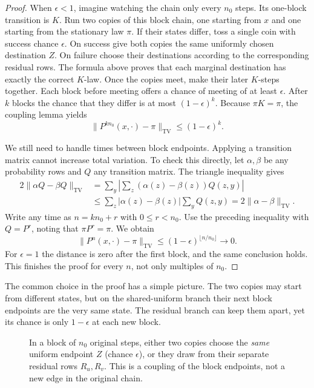 \begin{proof}
When $\epsilon<1$, imagine watching the chain only every $n_0$ steps. Its one-block transition is $K$. Run two copies of this block chain, one starting from $x$ and one starting from the stationary law $\pi$. If their states differ, toss a single coin with success chance $\epsilon$. On success give both copies the same uniformly chosen destination $Z$. On failure choose their destinations according to the corresponding residual rows. The formula above proves that each marginal destination has exactly the correct $K$-law. Once the copies meet, make their later $K$-steps together. Each block before meeting offers a chance of meeting of at least $\epsilon$. After $k$ blocks the chance that they differ is at most $(1-\epsilon)^k$. Because $\pi K=\pi$, the coupling lemma yields
\[
 \|P^{kn_0}(x,\cdot)-\pi\|_{\mathrm{TV}}
 \le (1-\epsilon)^k.
\]

We still need to handle times between block endpoints. Applying a transition matrix cannot increase total variation. To check this directly, let $\alpha,\beta$ be any probability rows and $Q$ any transition matrix. The triangle inequality gives
\[
\begin{aligned}
 2\|\alpha Q-\beta Q\|_{\mathrm{TV}}
 &=\sum_y\left|\sum_z(\alpha(z)-\beta(z))Q(z,y)\right|\\
 &\le\sum_z|\alpha(z)-\beta(z)|\sum_yQ(z,y)
 =2\|\alpha-\beta\|_{\mathrm{TV}}.
\end{aligned}
\]
Write any time as $n=kn_0+r$ with $0\le r<n_0$. Use the preceding inequality with $Q=P^r$, noting that $\pi P^r=\pi$. We obtain
\[
 \|P^n(x,\cdot)-\pi\|_{\mathrm{TV}}
 \le(1-\epsilon)^{\lfloor n/n_0\rfloor}\longrightarrow0.
\]
For $\epsilon=1$ the distance is zero after the first block, and the same conclusion holds. This finishes the proof for every $n$, not only multiples of $n_0$.
\end{proof}

The common choice in the proof has a simple picture. The two copies may start from different states, but on the shared-uniform branch their next block endpoints are the very same state. The residual branch can keep them apart, yet its chance is only $1-\epsilon$ at each new block.

\begin{figure}[ht]
\centering
{}
\caption{In a block of $n_0$ original steps, either two copies choose the \emph{same} uniform endpoint $Z$ (chance $\epsilon$), or they draw from their separate residual rows $R_u,R_v$. This is a coupling of the block endpoints, not a new edge in the original chain.}
\label{fig:commonjump}
\end{figure}


